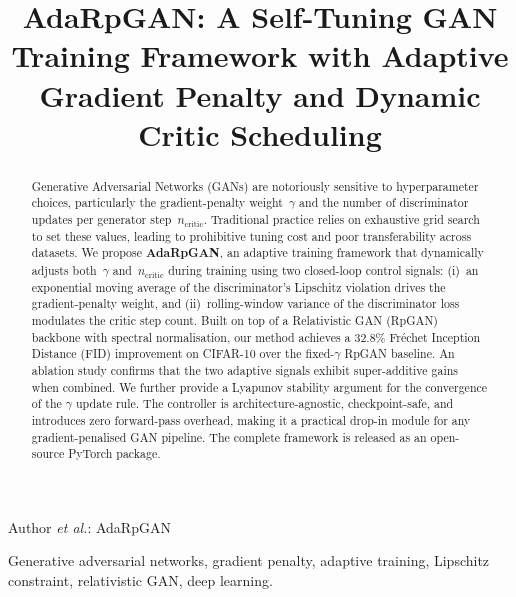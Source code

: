 \documentclass[journal]{IEEEtran}
\newcommand{\ncritic}{n_{\mathrm{critic}}}
\begin{document}
\title{AdaRpGAN: A Self-Tuning GAN Training Framework with Adaptive Gradient Penalty and Dynamic Critic Scheduling}

\author{
}

%
{Author \MakeLowercase{\textit{et al.}}: AdaRpGAN}

\maketitle

\begin{abstract}
Generative Adversarial Networks (GANs) are notoriously sensitive to hyperparameter choices, particularly the gradient-penalty weight~$\gamma$ and the number of discriminator updates per generator step~$\ncritic$. Traditional practice relies on exhaustive grid search to set these values, leading to prohibitive tuning cost and poor transferability across datasets. We propose \textbf{AdaRpGAN}, an adaptive training framework that dynamically adjusts both~$\gamma$ and~$\ncritic$ during training using two closed-loop control signals: (i)~an exponential moving average of the discriminator's Lipschitz violation drives the gradient-penalty weight, and (ii)~rolling-window variance of the discriminator loss modulates the critic step count. Built on top of a Relativistic GAN (RpGAN) backbone with spectral normalisation, our method achieves a 32.8\% Fr\'{e}chet Inception Distance (FID) improvement on CIFAR-10 over the fixed-$\gamma$ RpGAN baseline. An ablation study confirms that the two adaptive signals exhibit super-additive gains when combined. We further provide a Lyapunov stability argument for the convergence of the $\gamma$ update rule. The controller is architecture-agnostic, checkpoint-safe, and introduces zero forward-pass overhead, making it a practical drop-in module for any gradient-penalised GAN pipeline. The complete framework is released as an open-source PyTorch package.
\end{abstract}

\begin{IEEEkeywords}
Generative adversarial networks, gradient penalty, adaptive training, Lipschitz constraint, relativistic GAN, deep learning.
\end{IEEEkeywords}
\end{document}
